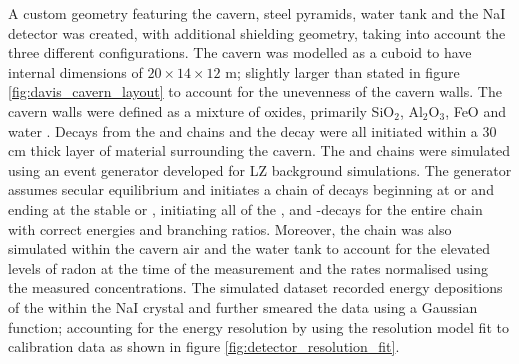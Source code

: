 A custom geometry featuring the cavern, steel pyramids, water tank and the NaI detector was created, with additional shielding geometry, taking into account the three different configurations. The cavern was modelled as a cuboid to have internal dimensions of $20 \times 14 \times 12$ m; slightly larger than stated in figure \ref{fig:davis_cavern_layout} to account for the unevenness of the cavern walls. The cavern walls were defined as a mixture of oxides, primarily SiO$_{2}$, Al$_{2}$O$_{3}$, FeO and water \cite{Mei_2010}. Decays from the \UTTE{} and \ThTTT{} chains and the \KFZ{} decay were all initiated within a 30 cm thick layer of material surrounding the cavern. The \UTTE{} and \ThTTT{} chains were simulated using an event generator developed for LZ background simulations. The generator assumes secular equilibrium and initiates a chain of decays beginning at \UTTE{} or \ThTTT{} and ending at the stable \PbTZS{} or \PbTZE{}, initiating all of the \alpha, \beta and \gamma-decays for the entire chain with correct  energies and branching ratios. Moreover, the \RnTTT{} chain was also simulated within the cavern air and the water tank to account for the elevated levels of radon at the time of the measurement and the rates normalised using the measured concentrations. The simulated dataset recorded energy depositions of the \grays{} within the NaI crystal and further smeared the data using a Gaussian function; accounting for the energy resolution by using the resolution model fit to calibration data as shown in figure \ref{fig:detector_resolution_fit}.

